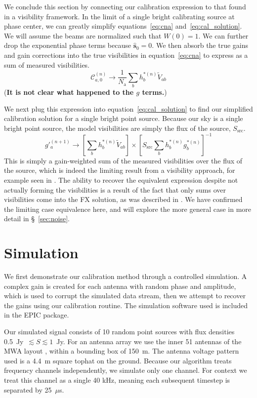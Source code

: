 \documentclass[a4paper,fleqn,usenatbib]{../mnras}
\newcommand{\Nant}{\ensuremath{N_{\mathrm{a}}}}
\newcommand{\spix}{\ensuremath{\hat{\mathbf{s}}_{0}}}
\newcommand{\beamtheta}{\ensuremath{W}}
\newcommand{\V}{\ensuremath{\widetilde{V}}}
\begin{document}
We conclude this section by connecting our calibration expression to that found in a visibility framework. In the limit of a single bright calibrating source at phase center, we can greatly simplify equations~\ref{eq:cna} and~\ref{eq:cal_solution}. We will assume the beams are normalized such that $\beamtheta(0)=1$. We can further drop the exponential phase terms because $\spix=0$. We then absorb the true gains and gain corrections into the true visibilities in equation~\ref{eq:cna} to express as a sum of measured visibilities.
\begin{equation}
\mathcal{C}^{(n)}_{a,0} \rightarrow \frac{1}{\Nant}\sum_b h^{*(n)}_b \V_{ab}
\end{equation}
({\bf It is not clear what happened to the $g$ terms.})

We next plug this expression into equation~\ref{eq:cal_solution} to find our simplified calibration solution for a single bright point source. Because our sky is a single bright point source, the model visibilities are simply the flux of the source, $S_{\mathrm{src}}$.
\begin{equation}
g'^{(n+1)}_a \rightarrow \left[\sum_b h^{*(n)}_b \V_{ab}\right] \times \left[S_{\mathrm{src}}\sum_b h^{*(n)}_b g^{*(n)}_b\right]^{-1}
\end{equation}
This is simply a gain-weighted sum of the measured visibilities over the flux of the source, which is indeed the limiting result from a visibility approach, for example seen in \citealt{mit08}. The ability to recover the equivalent expression despite not actually forming the visibilities is a result of the fact that only sums over visibilities come into the FX solution, as was described in \citealt{mor11}. We have confirmed the limiting case equivalence here, and will explore the more general case in more detail in \S~\ref{sec:noise}.


\section{Simulation}\label{sec:sim}
We first demonstrate our calibration method through a controlled simulation. A complex gain is created for each antenna with random phase and amplitude, which is used to corrupt the simulated data stream, then we attempt to recover the gains using our calibration routine. The simulation software used is included in the EPIC package.

Our simulated signal consists of 10 random point sources with flux densities 0.5~Jy~$\lesssim S \lesssim 1$~Jy. For an antenna array we use the inner 51 antennas of the MWA layout \citep{bea12}, within a bounding box of 150~m. The antenna voltage pattern used is a 4.4~m square tophat on the ground. Because our algorithm treats frequency channels independently, we simulate only one channel. For context we treat this channel as a single 40 kHz, meaning each subsequent timestep is separated by 25~$\mu$s.
\end{document}
